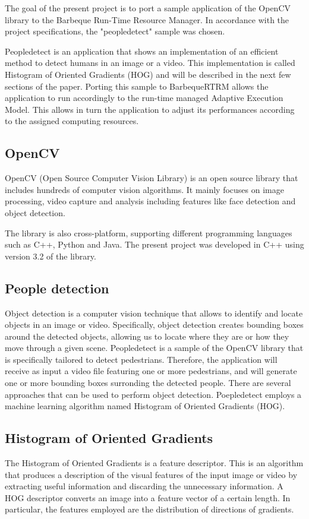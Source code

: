 The goal of the present project is to port a sample application of
the OpenCV library to the Barbeque Run-Time Resource Manager. In
accordance with the project specifications, the "peopledetect"
sample was chosen.

Peopledetect is an application that shows an implementation of
an efficient method to detect humans in an image or a video.
This implementation is called Histogram of Oriented Gradients (HOG)
and will be described in the next few sections of the paper.
Porting this sample to BarbequeRTRM allows the
application to run accordingly to the run-time managed Adaptive
Execution Model. This allows in turn the application to adjust its
performances according to the assigned computing resources.

\subsection{OpenCV}
OpenCV (Open Source Computer Vision Library) is an open source library
that includes hundreds of computer vision algorithms. It mainly focuses
on image processing, video capture and analysis including features like face
detection and object detection.

The library is also cross-platform, supporting different programming
languages such as C++, Python and Java.
The present project was developed in C++ using version 3.2
of the library.

\subsection{People detection}
Object detection is a computer vision technique that allows to
identify and locate objects in an image or video. Specifically,
object detection creates bounding boxes around the detected objects,
allowing us to locate where they are or how they move
through a given scene.  Peopledetect is a sample of the OpenCV
library that is specifically tailored to detect pedestrians.
Therefore, the application will receive as input a video file
featuring one or more pedestrians, and will generate one or more
bounding boxes surronding the detected people.
There are several approaches that can be used to perform object
detection. Poepledetect employs a machine learning algorithm named
Histogram of Oriented Gradients (HOG).

\subsection{Histogram of Oriented Gradients}
The Histogram of Oriented Gradients is a feature descriptor. This is
an algorithm that produces a description of the visual features of
the input image or video by extracting useful information and
discarding the unnecessary information.  A HOG descriptor converts
an image into a feature vector of a certain length. In particular,
the features employed are the distribution of directions of
gradients.

